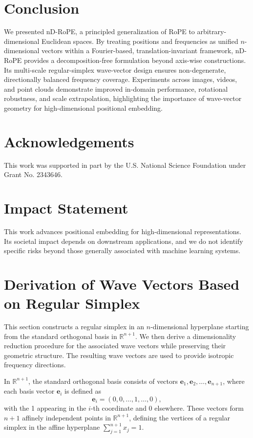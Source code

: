 \documentclass{article}
\theoremstyle{plain}
\theoremstyle{definition}
\theoremstyle{remark}
\begin{document}
\section{Conclusion}
We presented nD-RoPE, a principled generalization of RoPE to arbitrary-dimensional Euclidean spaces. By treating positions and frequencies as unified $n$-dimensional vectors within a Fourier-based, translation-invariant framework, nD-RoPE provides a decomposition-free formulation beyond axis-wise constructions. Its multi-scale regular-simplex wave-vector design ensures non-degenerate, directionally balanced frequency coverage. Experiments across images, videos, and point clouds demonstrate improved in-domain performance, rotational robustness, and scale extrapolation, highlighting the importance of wave-vector geometry for high-dimensional positional embedding.

\clearpage
\section*{Acknowledgements}
This work was supported in part by the U.S. National Science Foundation under Grant No. 2343646.

\section*{Impact Statement}
This work advances positional embedding for high-dimensional representations.
Its societal impact depends on downstream applications, and we do not identify specific risks beyond those generally associated with machine learning systems.




\newpage
\appendix
\onecolumn
\section{Derivation of Wave Vectors Based on Regular Simplex}
\label{appendix:gridpe_cal}
This section constructs a regular simplex in an $n$-dimensional hyperplane starting from the standard orthogonal basis in $\mathbb{R}^{n+1}$. We then derive a dimensionality reduction procedure for the associated wave vectors while preserving their geometric structure. The resulting wave vectors are used to provide isotropic frequency directions.

In $\mathbb{R}^{n+1}$, the standard orthogonal basis consists of vectors $\mathbf{e}_1, \mathbf{e}_2, \dots, \mathbf{e}_{n+1}$, where each basis vector $\mathbf{e}_i$ is defined as
\begin{equation}
\mathbf{e}_i = (0,0,\dots,1,\dots,0),
\end{equation}
with the 1 appearing in the $i$-th coordinate and 0 elsewhere. These vectors form $n{+}1$ affinely independent points in $\mathbb{R}^{n+1}$, defining the vertices of a regular simplex in the affine hyperplane $\sum_{j=1}^{n+1}x_j=1$.
\end{document}
